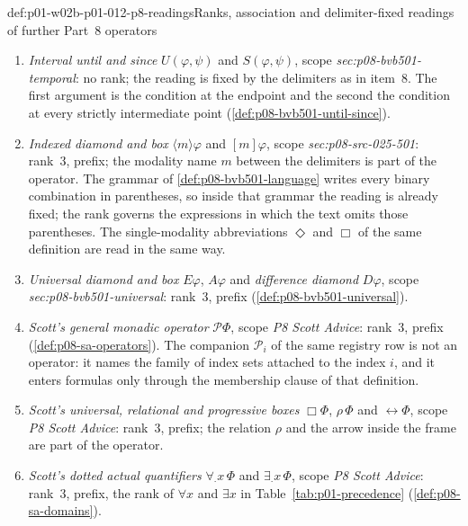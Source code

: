 \begin{hbconvention}{def:p01-w02b-p01-012-p8-readings}{Ranks, association and delimiter-fixed readings of further Part~8 operators}
\begin{enumerate}
  \emph{sec:p08-bvb501-model-checking}: no rank.  The reading is fixed by
  the delimiters: the parentheses and the comma bound the two arguments
  completely, the first being the target condition and the second the
  condition on the earlier points of the path
  (\cref{def:p08-bvb501-until-check}), and the whole form is an
  indivisible operand for every other operator.
\item \emph{Interval until and since} \(U(\varphi,\psi)\) and
  \(S(\varphi,\psi)\), scope \emph{sec:p08-bvb501-temporal}: no rank; the
  reading is fixed by the delimiters as in item~8.  The first argument is
  the condition at the endpoint and the second the condition at every
  strictly intermediate point (\cref{def:p08-bvb501-until-since}).
\item \emph{Indexed diamond and box} \(\langle m\rangle\varphi\) and
  \([m]\varphi\), scope \emph{sec:p08-src-025-501}: rank~3, prefix; the
  modality name \(m\) between the delimiters is part of the operator.  The
  grammar of \cref{def:p08-bvb501-language} writes every binary
  combination in parentheses, so inside that grammar the reading is
  already fixed; the rank governs the expressions in which the text omits
  those parentheses.  The single-modality abbreviations \(\Diamond\) and
  \(\Box\) of the same definition are read in the same way.
\item \emph{Universal diamond and box} \(E\varphi\), \(A\varphi\) and
  \emph{difference diamond} \(D\varphi\), scope
  \emph{sec:p08-bvb501-universal}: rank~3, prefix
  (\cref{def:p08-bvb501-universal}).
\item \emph{Scott's general monadic operator} \(\boxed{\mathscr P}\Phi\),
  scope \emph{P8 Scott Advice}: rank~3, prefix
  (\cref{def:p08-sa-operators}).  The companion \(\mathscr P_i\) of the
  same registry row is not an operator: it names the family of index sets
  attached to the index \(i\), and it enters formulas only through the
  membership clause of that definition.
\item \emph{Scott's universal, relational and progressive boxes}
  \(\Box\Phi\), \(\boxed\rho\,\Phi\) and \(\boxed{\leftrightarrow}\Phi\),
  scope \emph{P8 Scott Advice}: rank~3, prefix; the relation \(\rho\) and
  the arrow inside the frame are part of the operator.
\item \emph{Scott's dotted actual quantifiers} \(\forall_{\cdot}x\,\Phi\)
  and \(\exists_{\cdot}x\,\Phi\), scope \emph{P8 Scott Advice}: rank~3,
  prefix, the rank of \(\forall x\) and \(\exists x\) in
  Table~\ref{tab:p01-precedence} (\cref{def:p08-sa-domains}).

\end{enumerate}
\end{hbconvention}
